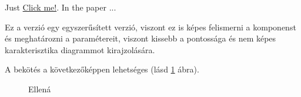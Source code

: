 Just \hyperlink{label1}{Click me!}. In the paper \cite{Test00}...



Ez a verzió egy egyszerűsített verzió, viszont ez is képes felismerni a komponenst és meghatározni a paramétereit, viszont kissebb a pontossága és nem képes karakterisztika diagrammot kirajzolására.

A bekötés a következőképpen lehetséges (lásd \ref{fig:basicTesterConnection} ábra).

\begin{figure}
    \centering
    \hfill
    \caption{Ellená}
    \label{fig:basicTesterConnection}
\end{figure}




%    
